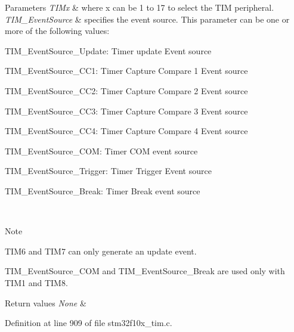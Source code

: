 \begin{DoxyParams}{Parameters}
{\em T\+I\+Mx} & where x can be 1 to 17 to select the T\+IM peripheral. \\
\hline
{\em T\+I\+M\+\_\+\+Event\+Source} & specifies the event source. This parameter can be one or more of the following values\+: \begin{DoxyItemize}
\item T\+I\+M\+\_\+\+Event\+Source\+\_\+\+Update\+: Timer update Event source \item T\+I\+M\+\_\+\+Event\+Source\+\_\+\+C\+C1\+: Timer Capture Compare 1 Event source \item T\+I\+M\+\_\+\+Event\+Source\+\_\+\+C\+C2\+: Timer Capture Compare 2 Event source \item T\+I\+M\+\_\+\+Event\+Source\+\_\+\+C\+C3\+: Timer Capture Compare 3 Event source \item T\+I\+M\+\_\+\+Event\+Source\+\_\+\+C\+C4\+: Timer Capture Compare 4 Event source \item T\+I\+M\+\_\+\+Event\+Source\+\_\+\+C\+OM\+: Timer C\+OM event source \item T\+I\+M\+\_\+\+Event\+Source\+\_\+\+Trigger\+: Timer Trigger Event source \item T\+I\+M\+\_\+\+Event\+Source\+\_\+\+Break\+: Timer Break event source \end{DoxyItemize}
\\
\hline
\end{DoxyParams}
\begin{DoxyNote}{Note}

\begin{DoxyItemize}
\item T\+I\+M6 and T\+I\+M7 can only generate an update event.
\item T\+I\+M\+\_\+\+Event\+Source\+\_\+\+C\+OM and T\+I\+M\+\_\+\+Event\+Source\+\_\+\+Break are used only with T\+I\+M1 and T\+I\+M8. 
\end{DoxyItemize}
\end{DoxyNote}

\begin{DoxyRetVals}{Return values}
{\em None} & \\
\hline
\end{DoxyRetVals}


Definition at line 909 of file stm32f10x\+\_\+tim.\+c.

